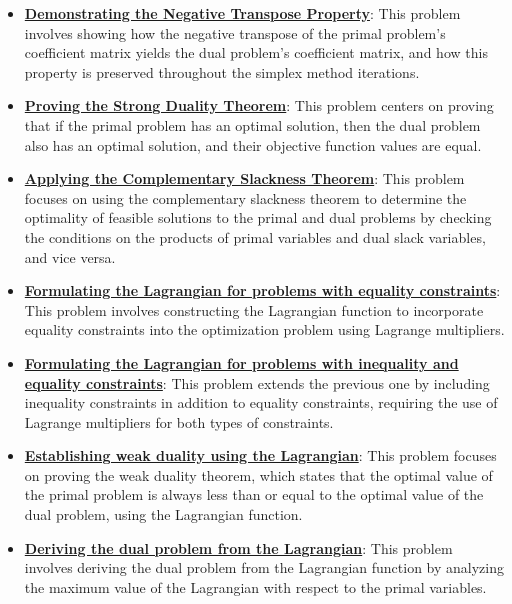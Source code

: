 \documentclass{article}%
\begin{document}
\begin{itemize}[leftmargin=*]
\item \href{https://www.math.purdue.edu/~yipn/421/2024-09-12-Duality.pdf#page=6}{\textbf{Demonstrating the Negative Transpose Property}}: This problem involves showing how the negative transpose of the primal problem's coefficient matrix yields the dual problem's coefficient matrix, and how this property is preserved throughout the simplex method iterations.%
\item \href{https://www.math.purdue.edu/~yipn/421/2024-09-12-Duality.pdf#page=11}{\textbf{Proving the Strong Duality Theorem}}: This problem centers on proving that if the primal problem has an optimal solution, then the dual problem also has an optimal solution, and their objective function values are equal.%
\item \href{https://www.math.purdue.edu/~yipn/421/2024-09-12-Duality.pdf#page=21}{\textbf{Applying the Complementary Slackness Theorem}}: This problem focuses on using the complementary slackness theorem to determine the optimality of feasible solutions to the primal and dual problems by checking the conditions on the products of primal variables and dual slack variables, and vice versa.%
\item \href{https://www.math.purdue.edu/~yipn/421/2024-09-17-DualityGeneral.pdf#page=2}{\textbf{Formulating the Lagrangian for problems with equality constraints}}: This problem involves constructing the Lagrangian function to incorporate equality constraints into the optimization problem using Lagrange multipliers.%
\item \href{https://www.math.purdue.edu/~yipn/421/2024-09-17-DualityGeneral.pdf#page=7}{\textbf{Formulating the Lagrangian for problems with inequality and equality constraints}}: This problem extends the previous one by including inequality constraints in addition to equality constraints, requiring the use of Lagrange multipliers for both types of constraints.%
\item \href{https://www.math.purdue.edu/~yipn/421/2024-09-17-DualityGeneral.pdf#page=5}{\textbf{Establishing weak duality using the Lagrangian}}: This problem focuses on proving the weak duality theorem, which states that the optimal value of the primal problem is always less than or equal to the optimal value of the dual problem, using the Lagrangian function.%
\item \href{https://www.math.purdue.edu/~yipn/421/2024-09-17-DualityGeneral.pdf#page=15}{\textbf{Deriving the dual problem from the Lagrangian}}: This problem involves deriving the dual problem from the Lagrangian function by analyzing the maximum value of the Lagrangian with respect to the primal variables.%

\end{itemize}
\end{document}
